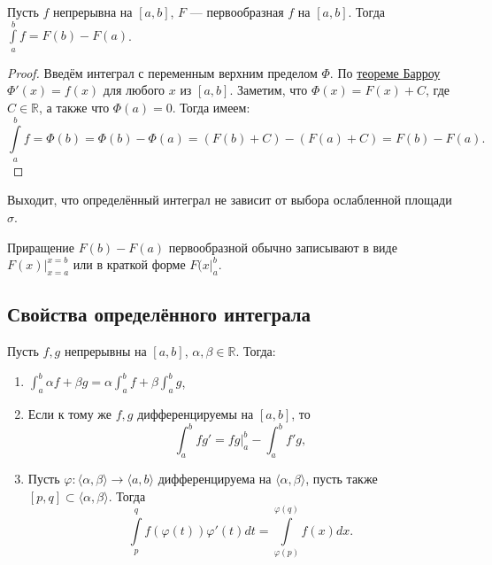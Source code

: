 \hypertarget{t9}{}
\begin{theorem}
	Пусть $f$ непрерывна на $[a, b]$, $F$ --- первообразная $f$ на $[a, b]$. Тогда \(\int\limits_a^b f = F(b) - F(a)\).
\end{theorem}
\begin{proof}
	Введём интеграл с переменным верхним пределом $\Phi$. По \hyperlink{t8}{теореме Барроу} $\Phi'(x) = f(x)$ для любого $x$ из $[a, b]$.
	Заметим, что $\Phi(x) = F(x) + C$, где $C \in \mathbb{R}$, а также что $\Phi(a) = 0$. Тогда имеем: \[
	\int\limits_a^b f = \Phi(b) = \Phi(b) - \Phi(a) = (F(b) + C) - (F(a) + C) = F(b) - F(a). 
	\]
\end{proof}

\begin{nremark}
	Выходит, что определённый интеграл не зависит от выбора ослабленной площади $\sigma$.
\end{nremark}

\begin{nremark}
	Приращение $F(b) - F(a)$ первообразной обычно записывают в виде $F(x) \bigg|_{x = a}^{x = b}$ или в краткой форме $F(x \bigg|_a^b$.
\end{nremark}

\subsection{Свойства определённого интеграла}

\begin{theorem}
	Пусть $f, g$ непрерывны на $[a, b]$, $\alpha, \beta \in \mathbb{R}$. Тогда:
	\begin{enumerate}
		\item \(\displaystyle \int_a^b \alpha f + \beta g = \alpha \int_a^b f + \beta \int_a^b g\),
		\item Если к тому же $f, g$ дифференцируемы на $[a, b]$, то \[
		\int_a^b fg' = fg \bigg|_a^b - \int_a^b f'g,
		\]
		\item Пусть $\varphi: \langle \alpha, \beta \rangle \to \langle a, b \rangle$ дифференцируема на $\langle \alpha, \beta \rangle$,
		пусть также $[p, q] \subset \langle \alpha, \beta \rangle$. Тогда \[
		\int\limits_p^q f(\varphi(t))\varphi'(t) dt = \int\limits_{\varphi(p)}^{\varphi(q)} f(x) dx.
		\]
	\end{enumerate}
\end{theorem}

